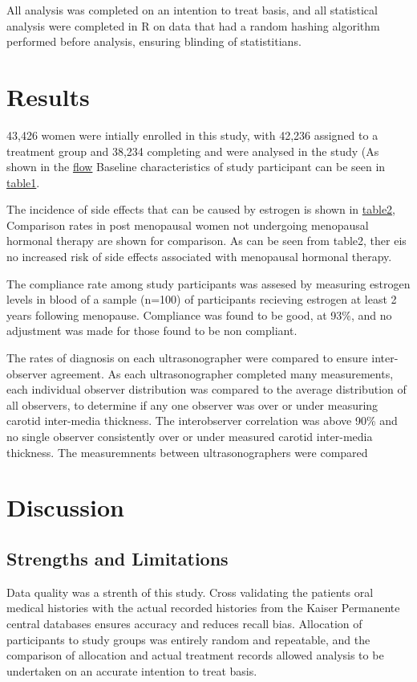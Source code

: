 \documentclass[11pt]{article}
\begin{document}
		All analysis was completed on an intention to treat basis, and all statistical analysis were completed in R \cite{RCoreTeam2012} on data that had a random hashing algorithm performed before analysis, ensuring blinding of statistitians.



	\section{Results}
		43,426 women were intially enrolled in this study, with 42,236 assigned to a treatment group and 38,234 completing and were analysed in the study (As shown in the \hyperref[Study Flow]{flow}
		Baseline characteristics of study participant can be seen in \hyperref[Table 1]{table1}.


		The incidence of side effects that can be caused by estrogen is shown in \hyperref[Table 2]{table2}, Comparison rates in post menopausal women not undergoing menopausal hormonal therapy are shown for comparison.
		As can be seen from table2, ther eis no increased risk of side effects associated with menopausal hormonal therapy.




		The compliance rate among study participants was assesed by measuring estrogen levels in blood of a sample (n=100) of participants recieving estrogen at least 2 years following menopause. Compliance was found to be good, at 93\%, and no adjustment was made for those found to be non compliant.

		
		The rates of diagnosis on each ultrasonographer were compared to ensure inter-observer agreement.
		As each ultrasonographer completed many measurements, each individual observer distribution was compared to the average distribution of all observers, to determine if any one observer was over or under measuring carotid inter-media thickness.
		The interobserver correlation was above 90\% and no single observer consistently over or under measured carotid inter-media thickness.
		The measuremnents between ultrasonographers were compared 


	\section{Discussion} 


	\subsection{Strengths and Limitations}
		Data quality was a strenth of this study.
		Cross validating the patients oral medical histories with the actual recorded histories from the Kaiser Permanente central databases ensures accuracy and reduces recall bias.
		Allocation of participants to study groups was entirely random and repeatable, and the comparison of allocation and actual treatment records allowed analysis to be undertaken on an accurate intention to treat basis. 
\end{document}
